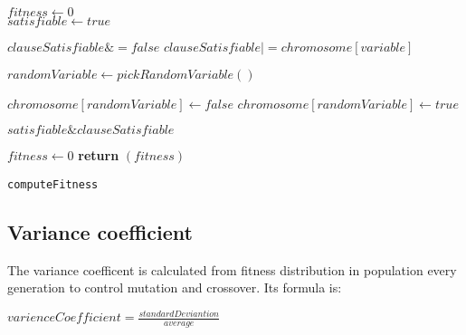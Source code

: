 \documentclass{article}
\begin{document}
	\begin{center}
			\begin{minipage}{1\linewidth} %
				\begin{algorithm}[H]
					\hrulefill
					\medskip

					$fitness \gets 0$\\
					$satisfiable \gets true$\\
					 {
						$clauseSatisfiable \&= false$
						 {
							 {
								$clauseSatisfiable |= chromosome[variable]$
							}
						}
						 {
							$randomVariable \gets pickRandomVariable()$

							 {
								$chromosome[randomVariable] \gets false$
							}
							 {
								$chromosome[randomVariable] \gets true$
							}
						}
						$satisfiable \& clauseSatisfiable$
					}
					 {
						$fitness\gets 0$
					}
					{\bf return} $(fitness)$
					\caption{\texttt{computeFitness}} %
					\label{alg:computeFitness}   %
				\end{algorithm}
			\end{minipage}
		\end{center}

	\subsection{Variance coefficient}
		The variance coefficent is calculated from fitness distribution in population every generation to control mutation and crossover. Its formula is:
		\begin{center}
			\begin{math}
				varienceCoefficient = \frac{standardDeviantion}{average}
			\end{math}
		\end{center}
\end{document}
